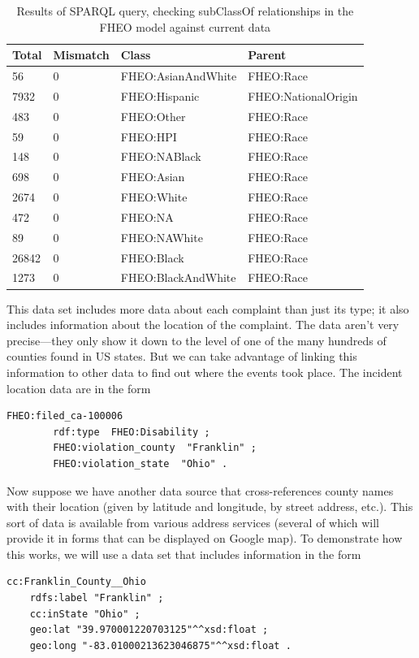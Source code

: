 \begin{table}
\caption{Results of SPARQL query, checking subClassOf relationships in
the FHEO model against current data}
\begin{tabular}{|llll|}
\hline
Total&Mismatch&Class&Parent\\
\hline
56&0&FHEO:AsianAndWhite&FHEO:Race\\
7932&0&FHEO:Hispanic&FHEO:NationalOrigin\\
483&0&FHEO:Other&FHEO:Race\\
59&0&FHEO:HPI&FHEO:Race\\
148&0&FHEO:NABlack&FHEO:Race\\
698&0&FHEO:Asian&FHEO:Race\\
2674&0&FHEO:White&FHEO:Race\\
472&0&FHEO:NA&FHEO:Race\\
89&0&FHEO:NAWhite&FHEO:Race\\
26842&0&FHEO:Black&FHEO:Race\\
1273&0&FHEO:BlackAndWhite&FHEO:Race\\

\hline
\end{tabular}
\label{tab:ch10.1}
\end{table}

This data set includes more data about each complaint than just its
type; it also includes information about the location of the complaint.
The data aren't very precise---they only show it down to the level
of one of the many hundreds of counties found in US states. But we can
take advantage of linking this information to other data to find out
where the events took place. The incident location data are in the form

\begin{lstlisting}
FHEO:filed_ca-100006
        rdf:type  FHEO:Disability ;
        FHEO:violation_county  "Franklin" ;
        FHEO:violation_state  "Ohio" .
\end{lstlisting}

Now suppose we have another data source that cross-references county names
with their location (given by latitude and longitude, by street address,
etc.). This sort of data is available from various address services
(several of which will provide it in forms that can be displayed on
Google map). To demonstrate how this works, we will use a data set
that  includes information in the form

\begin{lstlisting}
cc:Franklin_County__Ohio	
    rdfs:label "Franklin" ;
    cc:inState "Ohio" ;
	geo:lat "39.970001220703125"^^xsd:float ;
	geo:long "-83.01000213623046875"^^xsd:float .
\end{lstlisting}

